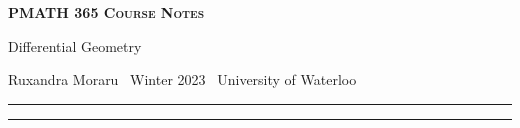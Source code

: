 \documentclass[10pt]{article}
\numberwithin{equation}{section}
\newcommand{\newtitle}[4]{
  \begin{center}
	\huge{\textbf{\textsc{#1 Course Notes}}}
    
	\large{\sc #2}
    
	{\sc #3 \textbullet\, #4 \textbullet\, University of Waterloo}
	\normalsize\vspace{1cm}\hrule
  \end{center}
}
\begin{document}
\pagestyle{fancy}
\newtitle{PMATH 365}{Differential Geometry}{Ruxandra Moraru}{Winter 2023}

\tableofcontents
\vspace{1cm}\hrule
\fancyhead[R]{\nouppercase\rightmark}
\newpage 
{}
\end{document}
